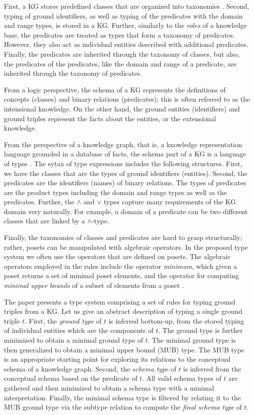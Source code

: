 \documentclass[runningheads]{llncs}
\begin{document}
First, a KG stores predefined classes that are organized into
taxonomies \cite{Baader2002}. Second, typing of ground identifiers, as
well as typing of the predicates with the domain and range types, is
stored in a KG. Further, similarly to the \emph{roles}
\cite{Brachman1985} of a knowledge base, the predicates are treated as
types that form a taxonomy of predicates. However, they also act as
individual entities described with additional predicates. Finally, the
predicates are inherited through the taxonomy of classes, but also,
the predicates of the predicates, like the domain and range of a
predicate, are inherited through the taxonomy of predicates.

From a logic perspective, the schema of a KG represents the
definitions of concepts (classes) and binary relations (predicates);
this is often referred to as the intensional knowledge. On the other
hand, the ground entities (identifiers) and ground triples represent
the facts about the entities, or the extensional knowledge.

From the perspective of a knowledge graph, that is, a knowledge
representation language grounded in a database of facts, the schema
part of a KG is a language of types \cite{Pierce2002}. The sytax of
type expressions includes the following structures. First, we have the
classes that are the types of ground identifiers (entities). Second,
the predicates are the identifiers (names) of binary relations. The
types of predicates are the product types including the domain and
range types as well as the predicates. Further, the $\land$ and $\lor$
types capture many requirements of the KG domain very naturally. For
example, a domain of a predicate can be two different classes that are
linked by a $\land$-type.

Finally, the taxonomies of classes and predicates are hard to grasp
structurally; rather, posets can be manipulated with algebraic
operators. In the proposed type system we often use the operators that
are defined on posets. The algebraic operators employed in the rules
include the operator \emph{minimum}, which given a poset returns a set
of minimal poset elements, and the operator for computing
\emph{minimal upper bounds} of a subset of elements from a poset
\cite{DaveyPriestley2002}.

The paper presents a type system comprising a set of rules for typing
ground triples from a KG. Let us give an abstract description of
typing a single ground triple $t$. First, the \emph{ground type} of
$t$ is inferred bottom-up, from the stored typing of individual
entities which are the components of $t$. The ground type is further
minimized to obtain a minimal ground type of $t$. The minimal ground
type is then generalized to obtain a minimal upper bound (MUB)
type. The MUB type is an appropriate starting point for exploring its
relations to the conceptual schema of a knowledge graph. Second, the
\emph{schema type} of $t$ is inferred from the conceptual schema based
on the predicate of $t$. All valid schema types of $t$ are gathered
and then minimized to obtain a schema type with a minimal
interpretation. Finally, the minimal schema type is filtered by
relating it to the MUB ground type via the subtype relation to compute
the \emph{final schema type} of $t$.
\end{document}
